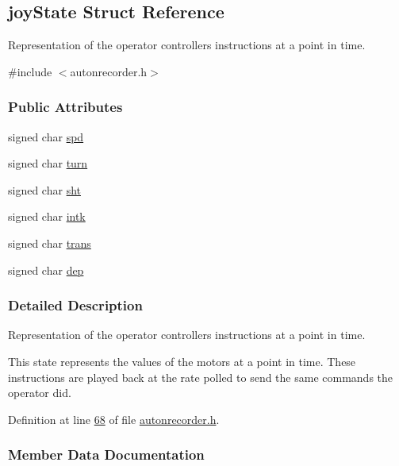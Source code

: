 \hypertarget{structjoy_state}{}\subsection{joy\+State Struct Reference}
\label{structjoy_state}


Representation of the operator controller\textquotesingle{}s instructions at a point in time.  




{\ttfamily \#include $<$autonrecorder.\+h$>$}

\subsubsection*{Public Attributes}
\begin{DoxyCompactItemize}
\item 
signed char \hyperlink{structjoy_state_a7867156ddb5bc22d57010c5af00c98af}{spd}
\item 
signed char \hyperlink{structjoy_state_aacdbb758b97190220423402f63020483}{turn}
\item 
signed char \hyperlink{structjoy_state_a751363be4e40b27bcbe558f41a15fe91}{sht}
\item 
signed char \hyperlink{structjoy_state_a2314ed43be31ccc565381efd8398b921}{intk}
\item 
signed char \hyperlink{structjoy_state_acc4f7bae078e8c8b7840cda61382c7cf}{trans}
\item 
signed char \hyperlink{structjoy_state_a3ba5ee3c4eec0e2ee03338b397a17958}{dep}
\end{DoxyCompactItemize}


\subsubsection{Detailed Description}
Representation of the operator controller\textquotesingle{}s instructions at a point in time. 

This state represents the values of the motors at a point in time. These instructions are played back at the rate polled to send the same commands the operator did. 

Definition at line \hyperlink{autonrecorder_8h_source_l00068}{68} of file \hyperlink{autonrecorder_8h_source}{autonrecorder.\+h}.



\subsubsection{Member Data Documentation}
